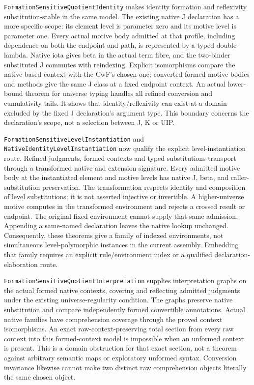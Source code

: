 \documentclass[11pt]{article}
\theoremstyle{definition}
\theoremstyle{remark}
\begin{document}
\nolinkurl{FormationSensitiveQuotientIdentity} makes identity formation and
reflexivity substitution-stable in the same model. The existing native J
declaration has a more specific scope: its element level is parameter zero
and its motive level is parameter one. Every actual motive body admitted
at that profile, including dependence on both the endpoint and path, is
represented by a typed double lambda. Native iota gives beta in the actual
term fibre, and the two-binder substituted J commutes with reindexing.
Explicit isomorphisms compare the native based context with the CwF's chosen
one; converted formed motive bodies and methods give the same J class at a
fixed endpoint context. An actual lower-bound theorem for universe typing
handles all refined conversion and cumulativity tails. It shows that
identity/reflexivity can exist at a domain excluded by the fixed J
declaration's argument type. This boundary concerns the declaration's scope,
not a selection between J, K or UIP.

\nolinkurl{FormationSensitiveLevelInstantiation} and
\nolinkurl{NativeIdentityLevelInstantiation} now qualify the explicit
level-instantiation route. Refined judgments, formed contexts and typed
substitutions transport through a transformed native and extension signature.
Every admitted motive body at the instantiated element and motive levels
has native J, beta, and caller-substitution preservation. The transformation
respects identity and composition of level substitutions; it is not asserted
injective or invertible. A higher-universe motive computes in the transformed
environment and rejects a crossed result or endpoint. The original fixed
environment cannot supply that same admission. Appending a same-named
declaration leaves the native lookup unchanged. Consequently, these theorems
give a family of indexed environments, not simultaneous level-polymorphic
instances in the current assembly. Embedding that family requires an explicit
rule/environment index or a qualified declaration-elaboration route.

\nolinkurl{FormationSensitiveQuotientInterpretation} supplies interpretation
graphs on the actual formed native contexts, covering and reflecting
admitted judgments under the existing universe-regularity condition.
The graphs preserve native substitution and compare independently formed
convertible annotations. Actual native families have comprehension coverage
through the proved context isomorphisms. An exact raw-context-preserving
total section from every raw context into this formed-context model is
impossible when an unformed context is present. This is a domain obstruction
for that exact section, not a theorem against arbitrary semantic maps or
exploratory unformed syntax. Conversion invariance likewise cannot make two
distinct raw comprehension objects literally the same chosen object.
\end{document}
